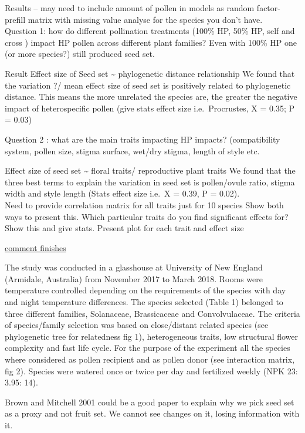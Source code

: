 \documentclass[11pt,a4paper]{article}
\begin{document}
Results -- may need to include amount of pollen in models as random
factor- prefill matrix with missing value analyse for the species you
don't have.\\
Question 1: how do different pollination treatments (100\% HP, 50\% HP,
self and cross ) impact HP pollen across different plant families? Even
with 100\% HP one (or more species?) still produced seed set.

Result Effect size of Seed set \textasciitilde{} phylogenetic distance
relationship We found that the variation ?/ mean effect size of seed set
is positively related to phylogenetic distance. This means the more
unrelated the species are, the greater the negative impact of
heterospecific pollen (give stats effect size i.e.~Procrustes, X = 0.35;
P = 0.03)

Question 2 : what are the main traits impacting HP impacts?
(compatibility system, pollen size, stigma surface, wet/dry stigma,
length of style etc.

Effect size of seed set \textasciitilde{} floral traits/ reproductive
plant traits We found that the three best terms to explain the variation
in seed set is pollen/ovule ratio, stigma width and style length (Stats
effect size i.e.~X = 0.39, P = 0.02).\\
Need to provide correlation matrix for all traits just for 10 species
Show both ways to present this. Which particular traits do you find
significant effects for? Show this and give stats. Present plot for each
trait and effect size

\href{}{comment finishes}

The study was conducted in a glasshouse at University of New England
(Armidale, Australia) from November 2017 to March 2018. Rooms were
temperature controlled depending on the requirements of the species with
day and night temperature differences. The species selected (Table 1)
belonged to three different families, Solanaceae, Brassicaceae and
Convolvulaceae. The criteria of species/family selection was based on
close/distant related species (see phylogenetic tree for relatedness fig
1), heterogeneous traits, low structural flower complexity and fast life
cycle. For the purpose of the experiment all the species where
considered as pollen recipient and as pollen donor (see interaction
matrix, fig 2). Species were watered once or twice per day and
fertilized weekly (NPK 23: 3.95: 14).

Brown and Mitchell 2001 could be a good paper to explain why we pick
seed set as a proxy and not fruit set. We cannot see changes on it,
losing information with it.
\end{document}
